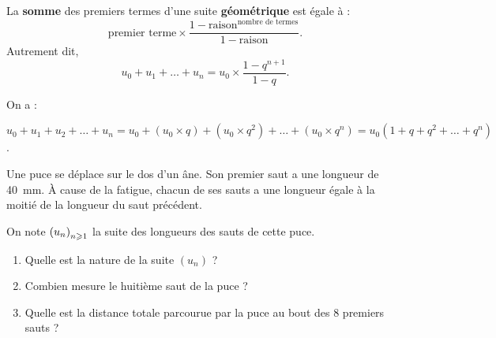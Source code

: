 \documentclass[a4paper,11pt]{article}
\begin{document}
\begin{cprop}
La \textbf{somme} des premiers termes d'une suite \textbf{géométrique} est égale à :\[ \text{premier terme} \times \frac{1 - \text{raison}^{\text{nombre de termes}}}{1 - \text{raison} }.\]%
Autrement dit, \[u_0+u_1+ \dots + u_n=u_0 \times \frac{1-q^{n+1}}{1-q}.\]
\end{cprop}

\begin{cdemo}
On a :

$u_0+u_1+u_2+\dots+u_n = u_0+(u_0 \times q)+(u_0\times q^2)+\dots+(u_0 \times q^n) = u_0(1+q+q^2+ \dots + q^n)$.
\end{cdemo}

\begin{cexercice}
Une puce se déplace sur le dos d'un âne. Son premier saut a une longueur de 40~mm. À cause de la fatigue, chacun de ses sauts a une longueur égale à la moitié de la longueur du saut précédent.

On note $\left( u_n \right)_{n \geqslant 1}$ la suite des longueurs des sauts de cette puce.
\begin{enumerate}
	\item Quelle est la nature de la suite $(u_n)$ ?
	\item Combien mesure le huitième saut de la puce ?
	\item Quelle est la distance totale parcourue par la puce au bout des 8 premiers sauts ?
\end{enumerate}
\end{cexercice}
\end{document}
